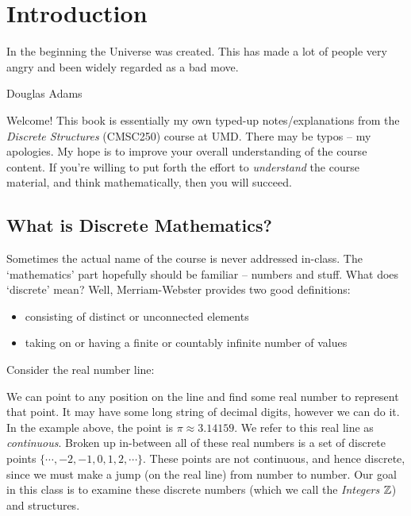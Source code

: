 \documentclass[main.tex]{subfiles}
\begin{document}
\chapter{Introduction}

\epigraph{In the beginning the Universe was created. This has made a lot of people very angry and been widely regarded as a bad move.}{Douglas Adams}

Welcome! This book is essentially my own typed-up notes/explanations from the \textit{Discrete Structures} (CMSC250) course at UMD. There may be typos -- my apologies. My hope is to improve your overall understanding of the course content. If you're willing to put forth the effort to \textit{understand} the course material, and think mathematically, then you will succeed.

\section{What is Discrete Mathematics?}

Sometimes the actual name of the course is never addressed in-class. The `mathematics' part hopefully should be familiar -- numbers and stuff. What does `discrete' mean? Well, Merriam-Webster provides two good definitions:

\begin{defn}
	\leavevmode
	\begin{itemize}
		\item consisting of distinct or unconnected elements
		\item taking on or having a finite or countably infinite number of values
	\end{itemize}
\end{defn}

Consider the real number line:

\begin{center}
\end{center}

We can point to any position on the line and find some real number to represent that point. It may have some long string of decimal digits, however we can do it. In the example above, the point is \(\pi \approx 3.14159\). We refer to this real line as \textit{continuous}. Broken up in-between all of these real numbers is a set of discrete points \(\{\cdots,-2,-1,0,1,2,\cdots\}\). These points are not continuous, and hence discrete, since we must make a jump (on the real line) from number to number. Our goal in this class is to examine these discrete numbers (which we call the \textit{Integers} \(\mathbb{Z}\)) and structures.
\end{document}

